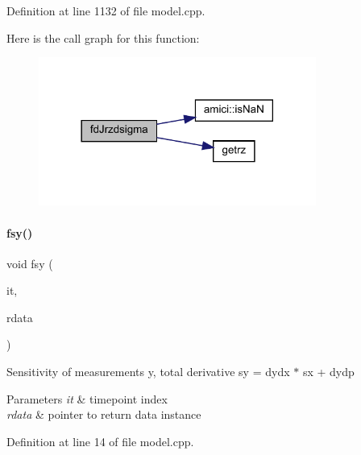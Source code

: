 Definition at line 1132 of file model.\+cpp.

Here is the call graph for this function\+:
\nopagebreak
\begin{figure}[H]
\begin{center}
\leavevmode
\includegraphics[width=258pt]{classamici_1_1_model_a3e6a11cdaa35b6e85d013eb9f63564d2_cgraph}
\end{center}
\end{figure}
\mbox{\label{classamici_1_1_model_a6b1c331013c5947e77129cb4da82713e}} 
\paragraph{\texorpdfstring{fsy()}{fsy()}}
{\footnotesize\ttfamily void fsy (\begin{DoxyParamCaption}\item[{const int}]{it,  }\item[{\mbox{\hyperlink{classamici_1_1_return_data}{Return\+Data}} $\ast$}]{rdata }\end{DoxyParamCaption})}

Sensitivity of measurements y, total derivative sy = dydx $\ast$ sx + dydp 
\begin{DoxyParams}{Parameters}
{\em it} & timepoint index \\
\hline
{\em rdata} & pointer to return data instance \\
\hline
\end{DoxyParams}


Definition at line 14 of file model.\+cpp.

